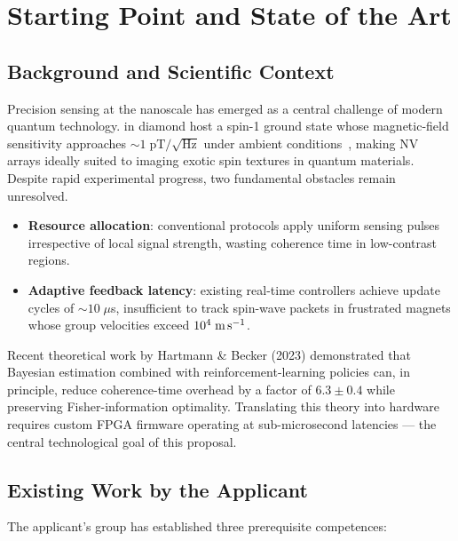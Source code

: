 \section{Starting Point and State of the Art}
\label{sec:state}

\subsection{Background and Scientific Context}

Precision sensing at the nanoscale has emerged as a central challenge of modern quantum
technology.  in diamond host a spin-1 ground state
whose magnetic-field sensitivity approaches $\sim1\;\text{pT}/\!\sqrt{\text{Hz}}$ under
ambient conditions~\cite{barry2020}, making NV arrays ideally suited to imaging exotic
spin textures in quantum materials. Despite rapid experimental progress, two fundamental
obstacles remain unresolved.

\begin{itemize}[leftmargin=*,itemsep=2pt]
  \item \textbf{Resource allocation}: conventional protocols apply uniform sensing pulses
        irrespective of local signal strength, wasting coherence time in low-contrast
        regions.
  \item \textbf{Adaptive feedback latency}: existing real-time controllers achieve
        update cycles of ${\sim}10\;\mu$s, insufficient to track spin-wave packets in
        frustrated magnets whose group velocities exceed $10^4\;\text{m\,s}^{-1}$.
\end{itemize}

Recent theoretical work by Hartmann \& Becker (2023) demonstrated that Bayesian
estimation combined with reinforcement-learning policies can, in principle, reduce
coherence-time overhead by a factor of $6.3\pm0.4$ while preserving Fisher-information
optimality. Translating this theory into hardware requires custom FPGA firmware
operating at sub-microsecond latencies — the central technological goal of this proposal.

\subsection{Existing Work by the Applicant}

The applicant's group has established three prerequisite competences:

